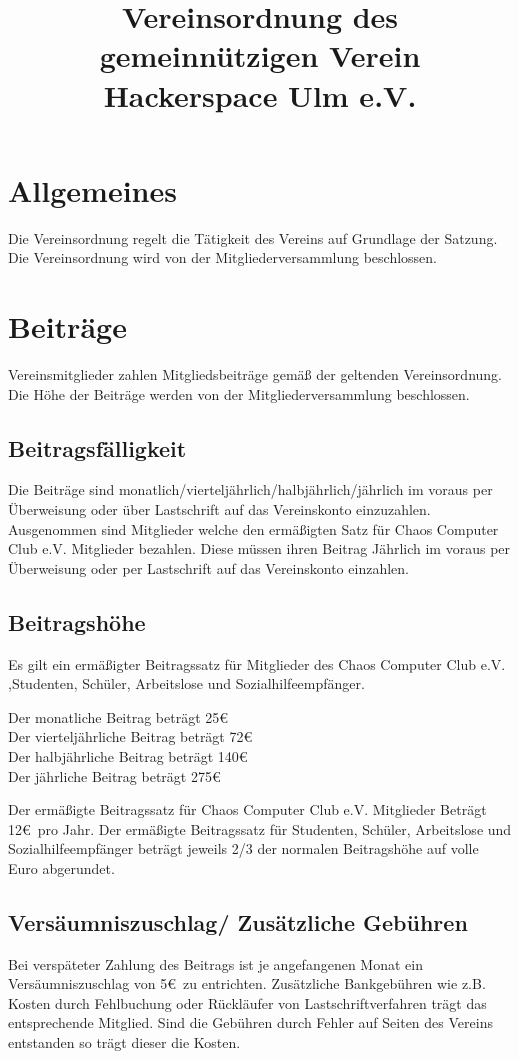 \documentclass[a4paper, 12pt]{scrartcl}
\title{Vereinsordnung des gemeinnützigen Verein Hackerspace Ulm e.V. }
\author{}
\date{}
\begin{document}
\maketitle
\sffamily

\section{Allgemeines}
Die Vereinsordnung regelt die Tätigkeit des Vereins auf Grundlage der Satzung. Die Vereinsordnung wird von der Mitgliederversammlung beschlossen. 
\section{Beiträge}
Vereinsmitglieder zahlen Mitgliedsbeiträge gemäß der geltenden Vereinsordnung. Die Höhe der Beiträge werden von der Mitgliederversammlung beschlossen. 
\subsection{Beitragsfälligkeit}
Die Beiträge sind monatlich/vierteljährlich/halbjährlich/jährlich im voraus per Überweisung oder über Lastschrift auf das Vereinskonto einzuzahlen.
Ausgenommen sind Mitglieder welche den ermäßigten Satz für Chaos Computer Club e.V. Mitglieder bezahlen. Diese müssen ihren Beitrag Jährlich im voraus per Überweisung
oder per Lastschrift auf das Vereinskonto einzahlen.
\subsection{Beitragshöhe}

Es gilt ein ermäßigter Beitragssatz für Mitglieder des Chaos Computer Club e.V. ,Studenten, Schüler, Arbeitslose und Sozialhilfeempfänger. 
\begin{addmargin}[0.25in]{0cm}
Der monatliche Beitrag beträgt 25\euro{}\\
Der vierteljährliche Beitrag beträgt 72\euro{}\\
Der halbjährliche Beitrag beträgt 140\euro{} \\
Der jährliche Beitrag beträgt 275\euro{}
\end{addmargin}
Der ermäßigte Beitragssatz für Chaos Computer Club e.V. Mitglieder Beträgt 12\euro \  pro Jahr.
Der ermäßigte Beitragssatz für Studenten, Schüler, Arbeitslose und Sozialhilfeempfänger beträgt jeweils 2/3 der normalen Beitragshöhe auf volle Euro abgerundet.
\subsection{Versäumniszuschlag/ Zusätzliche Gebühren}
Bei verspäteter Zahlung des Beitrags ist je angefangenen Monat ein Versäumniszuschlag von 5\euro \ zu entrichten. Zusätzliche Bankgebühren wie z.B. Kosten durch Fehlbuchung oder Rückläufer von Lastschriftverfahren trägt das entsprechende Mitglied. Sind die Gebühren durch Fehler auf Seiten des Vereins entstanden so trägt dieser die Kosten. 
\end{document}
